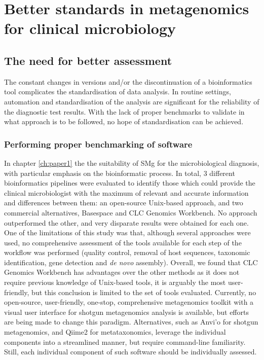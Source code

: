 \section{Better standards in metagenomics for clinical microbiology}

\subsection{The need for better assessment}

The constant changes in versions and/or the discontinuation of a bioinformatics tool complicates the standardisation of data analysis. In routine settings, automation and standardisation of the analysis are significant for the reliability of the diagnostic test results. With the lack of proper benchmarks to validate in what approach is to be followed, no hope of standardisation can be achieved.


\subsubsection{Performing proper benchmarking of software}

In chapter \ref{ch:paper1} the the suitability of SMg for the microbiological diagnosis, with particular emphasis on the bioinformatic process. In total, 3 different bioinformatics pipelines were evaluated to identify those which could provide the clinical microbiologist with the maximum of relevant and accurate information and differences between them: an open-source Unix-based approach, and two commercial alternatives, Basespace and CLC Genomics Workbench. No approach outperformed the other, and very disparate results were obtained for each one. One of the limitations of this study was that, although several approaches were used, no comprehensive assessment of the tools available for each step of the workflow was performed (quality control, removal of host sequences, taxonomic identification, gene detection and \textit{de novo} assembly). Overall, we found that CLC Genomics Workbench has advantages over the other methods as it does not require previous knowledge of Unix-based tools, it is arguably the most user-friendly, but this conclusion is limited to the set of tools evaluated. Currently, no open-source, user-friendly, one-stop, comprehensive metagenomics toolkit with a visual user interface for shotgun metagenomics analysis is available, but efforts are being made to change this paradigm. Alternatives, such as Anvi'o \citep{eren_anvio_2015} for shotgun metagenomics, and Qiime2 \citep{bolyen_reproducible_2019} for metataxonomics, leverage the individual components into a streamlined manner, but require command-line familiarity. Still, each individual component of such software should be individually assessed.

